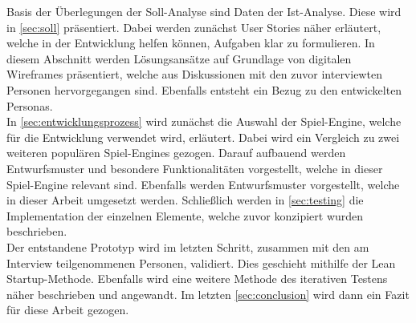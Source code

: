 Basis der Überlegungen der Soll-Analyse sind Daten der Ist-Analyse.
Diese wird in \autoref{sec:soll} präsentiert.
Dabei werden zunächst User Stories näher erläutert, welche in der Entwicklung helfen können, Aufgaben klar zu formulieren.
In diesem Abschnitt werden Lösungsansätze auf Grundlage von digitalen Wireframes präsentiert, welche aus Diskussionen mit den zuvor interviewten Personen hervorgegangen sind.
Ebenfalls entsteht ein Bezug zu den entwickelten Personas. \\

In \autoref{sec:entwicklungsprozess} wird zunächst die Auswahl der Spiel-Engine, welche für die Entwicklung verwendet wird, erläutert.
Dabei wird ein Vergleich zu zwei weiteren populären Spiel-Engines gezogen.
Darauf aufbauend werden Entwurfsmuster und besondere Funktionalitäten vorgestellt, welche in dieser Spiel-Engine relevant sind.
Ebenfalls werden Entwurfsmuster vorgestellt, welche in dieser Arbeit umgesetzt werden.
Schließlich werden in \autoref{sec:testing} die Implementation der einzelnen Elemente, welche zuvor konzipiert wurden beschrieben. \\

Der entstandene Prototyp wird im letzten Schritt, zusammen mit den am Interview teilgenommenen Personen, validiert.
Dies geschieht mithilfe der Lean Startup-Methode.
Ebenfalls wird eine weitere Methode des iterativen Testens näher beschrieben und angewandt.
Im letzten \autoref{sec:conclusion} wird dann ein Fazit für diese Arbeit gezogen.
